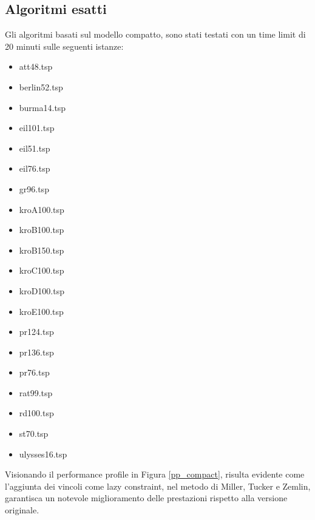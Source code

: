 \subsection{Algoritmi esatti}
Gli algoritmi basati sul modello compatto, sono stati testati con un time limit di 20 minuti sulle seguenti istanze:
\begin{center}
\begin{multicols}{3}
\begin{itemize}
\item{att48.tsp}
\item{berlin52.tsp}
\item{burma14.tsp}
\item{eil101.tsp}
\item{eil51.tsp}
\item{eil76.tsp}
\item{gr96.tsp}
\item{kroA100.tsp}
\item{kroB100.tsp}
\item{kroB150.tsp}
\item{kroC100.tsp}
\item{kroD100.tsp}
\item{kroE100.tsp}
\item{pr124.tsp}
\item{pr136.tsp}
\item{pr76.tsp}
\item{rat99.tsp}
\item{rd100.tsp}
\item{st70.tsp}
\item{ulysses16.tsp}
\end{itemize}
\end{multicols}
\end{center}
Visionando il performance profile in Figura \ref{pp_compact}, risulta evidente come l'aggiunta dei vincoli come lazy constraint, nel metodo di Miller, Tucker e Zemlin, garantisca un notevole miglioramento delle prestazioni rispetto alla versione originale.\\
